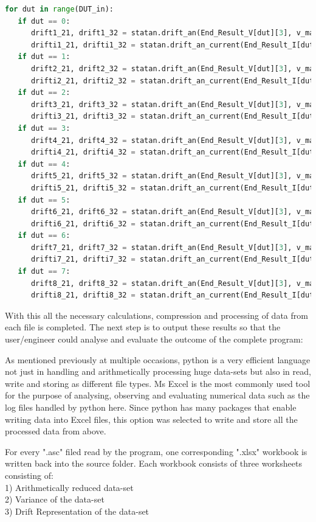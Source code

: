 \begin{lstlisting}[language = Python]
for dut in range(DUT_in):
   if dut == 0:
      drift1_21, drift1_32 = statan.drift_an(End_Result_V[dut][3], v_max, v_min)
      drifti1_21, drifti1_32 = statan.drift_an_current(End_Result_I[dut][3], i_max, i_min)
   if dut == 1:
      drift2_21, drift2_32 = statan.drift_an(End_Result_V[dut][3], v_max, v_min)
      drifti2_21, drifti2_32 = statan.drift_an_current(End_Result_I[dut][3], i_max, i_min)
   if dut == 2:
      drift3_21, drift3_32 = statan.drift_an(End_Result_V[dut][3], v_max, v_min)
      drifti3_21, drifti3_32 = statan.drift_an_current(End_Result_I[dut][3], i_max, i_min)
   if dut == 3:
      drift4_21, drift4_32 = statan.drift_an(End_Result_V[dut][3], v_max, v_min)
      drifti4_21, drifti4_32 = statan.drift_an_current(End_Result_I[dut][3], i_max, i_min)
   if dut == 4:
      drift5_21, drift5_32 = statan.drift_an(End_Result_V[dut][3], v_max, v_min)
      drifti5_21, drifti5_32 = statan.drift_an_current(End_Result_I[dut][3], i_max, i_min)
   if dut == 5:
      drift6_21, drift6_32 = statan.drift_an(End_Result_V[dut][3], v_max, v_min)
      drifti6_21, drifti6_32 = statan.drift_an_current(End_Result_I[dut][3], i_max, i_min)
   if dut == 6:
      drift7_21, drift7_32 = statan.drift_an(End_Result_V[dut][3], v_max, v_min)
      drifti7_21, drifti7_32 = statan.drift_an_current(End_Result_I[dut][3], i_max, i_min)
   if dut == 7:
      drift8_21, drift8_32 = statan.drift_an(End_Result_V[dut][3], v_max, v_min)
      drifti8_21, drifti8_32 = statan.drift_an_current(End_Result_I[dut][3], i_max, i_min)
\end{lstlisting}

With this all the necessary calculations, compression and processing of data from each file is completed. The next step is to output these results so that the user/engineer could analyse and evaluate the outcome of the complete program:


As mentioned previously at multiple occasions, python is a very efficient language not just in handling and arithmetically processing huge data-sets but also in read, write and storing as different file types. Ms Excel is the most commonly used tool for the purpose of analysing, observing and evaluating numerical data such as the log files handled by python here. Since python has many packages that enable writing data into Excel files, this option was selected to write and store all the processed data from above. 

For every ".asc" filed read by the program, one corresponding ".xlsx" workbook is written back into the source folder. Each workbook consists of three worksheets consisting of:\\
1) Arithmetically reduced data-set\\
2) Variance of the data-set \\
3) Drift Representation of the data-set

